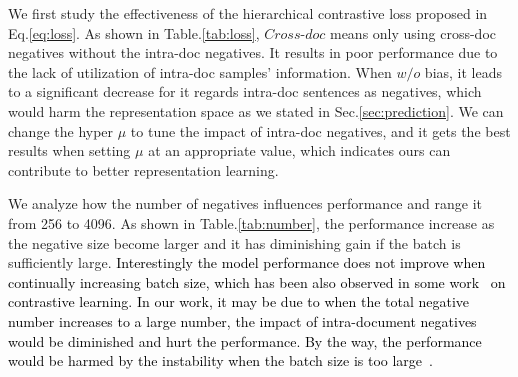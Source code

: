 We first study the effectiveness of the hierarchical contrastive loss proposed in Eq.\ref{eq:loss}. As shown in Table.\ref{tab:loss}, $Cross\text{-}doc$ means only using cross-doc negatives without the intra-doc negatives. It results in poor performance due to the lack of utilization of intra-doc samples' information. When $w/o$ bias, it leads to a significant decrease for it regards intra-doc sentences as negatives, which would 
harm the representation space as we stated in Sec.\ref{sec:prediction}. We can change the hyper $\mu$ to tune the impact of intra-doc negatives, and it gets the best results when setting $\mu$ at an appropriate value, which indicates ours can contribute to better representation learning.

 We analyze how the number of negatives influences performance and range it from 256 to 4096. As shown in Table.\ref{tab:number}, the performance increase as the negative size become larger and it has diminishing gain if the batch is sufficiently large.
\textcolor{black}{Interestingly the model performance does not improve when continually increasing batch size, which has been also observed in some work~\citep{cao-etal-2022-exploring, chen2021empirical} on contrastive learning. In our work, it may be due to when the total negative number increases to a large number, the impact of intra-document negatives would be diminished and hurt the performance. By the way, the performance would be harmed by the instability when the batch size is too large~\citep{chen2021empirical}.}





